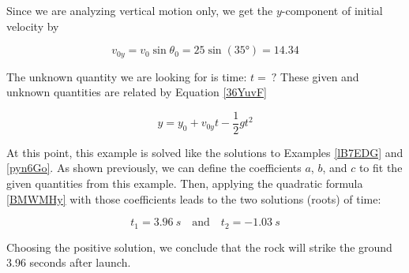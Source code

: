 \documentclass{article}
\begin{document}
\vspace{1em}

Since we are analyzing vertical motion only, we get the $y$-component of initial velocity by

\begin{equation*}
    v_{0y} = v_0 \sin{\theta_0} = 25 \sin{(\ang{35})} = 14.34
\end{equation*}

 The unknown quantity we are looking for is time: $t =\ ?$ These given and unknown quantities are related by Equation \eqref{36YuvF}

\begin{equation*}
    y = y_0 + v_{0y}t - \frac{1}{2} g t^2
\end{equation*}

At this point, this example is solved like the solutions to Examples \ref{lB7EDG} and \ref{pyn6Go}. As shown previously, we can define the coefficients $a$, $b$, and $c$ to fit the given quantities from this example. Then, applying the quadratic formula \eqref{BMWMHy} with those coefficients leads to the two solutions (roots) of time:

\begin{equation*}
    t_1 = \SI{3.96}{s} \quad \text{and} \quad t_2 = \SI{-1.03}{s}
\end{equation*}

Choosing the positive solution, we conclude that the rock will strike the ground 3.96 seconds after launch.
\end{document}
